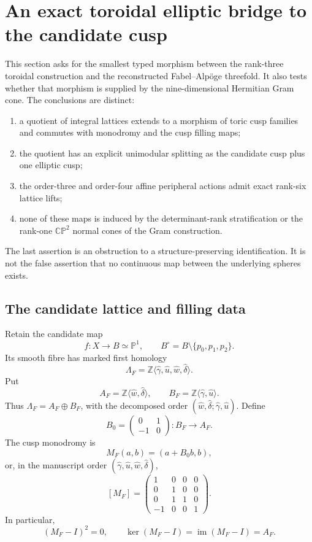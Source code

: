 \section{An exact toroidal elliptic bridge to the candidate cusp}
\label{sec:teb-main}

This section asks for the smallest typed morphism between the rank-three
toroidal construction and the reconstructed Fabel--Alpöge threefold.  It also
tests whether that morphism is supplied by the nine-dimensional Hermitian Gram
cone.  The conclusions are distinct:
\begin{enumerate}
\item a quotient of integral lattices extends to a morphism of toric cusp
families and commutes with monodromy and the cusp filling maps;
\item the quotient has an explicit unimodular splitting as the candidate cusp
plus one elliptic cusp;
\item the order-three and order-four affine peripheral actions admit exact rank-six
lattice lifts;
\item none of these maps is induced by the determinant-rank stratification or
the rank-one \(\mathbb{CP}^{2}\) normal cones of the Gram construction.
\end{enumerate}
The last assertion is an obstruction to a structure-preserving
identification.  It is not the false assertion that no continuous map between
the underlying spheres exists.

\subsection{The candidate lattice and filling data}
\label{subsec:teb-candidate-data}

Retain the candidate map
\[
 f:X\longrightarrow B\simeq\mathbb P^{1},
 \qquad B^{\circ}=B\setminus\{p_{0},p_{1},p_{2}\}.
\]
Its smooth fibre has marked first homology
\[
 \Lambda_F=
 \mathbb Z\langle\widehat\gamma,\widehat u,
                       \widehat w,\widehat\delta\rangle.
\]
Put
\[
 A_F=\mathbb Z\langle\widehat w,\widehat\delta\rangle,
 \qquad
 B_F=\mathbb Z\langle\widehat\gamma,\widehat u\rangle.
\]
Thus \(\Lambda_F=A_F\oplus B_F\), with the decomposed order
\((\widehat w,\widehat\delta;\widehat\gamma,\widehat u)\).  Define
\[
 B_0=\begin{pmatrix}0&1\\-1&0\end{pmatrix}:B_F\longrightarrow A_F.
 \tag{TEB.1}
\]
The cusp monodromy is
\[
 M_F(a,b)=(a+B_0b,b),
 \tag{TEB.2}
\]
or, in the manuscript order
\((\widehat\gamma,\widehat u,\widehat w,\widehat\delta)\),
\[
 [M_F]=
 \begin{pmatrix}
 1&0&0&0\\
 0&1&0&0\\
 0&1&1&0\\
 -1&0&0&1
 \end{pmatrix}.
 \tag{TEB.3}
\]
In particular,
\[
 (M_F-I)^2=0,
 \qquad
 \ker(M_F-I)=\operatorname{im}(M_F-I)=A_F.
 \tag{TEB.4}
\]

